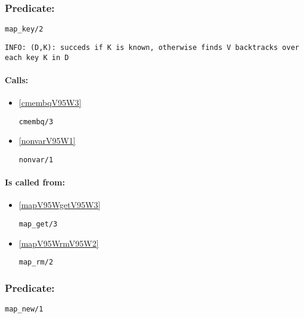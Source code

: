 \subsubsection{Predicate:} \label{mapV95WkeyV95W2}

\begin{verbatim}
map_key/2
\end{verbatim}

{\small \begin{verbatim}
INFO: (D,K): succeds if K is known, otherwise finds V backtracks over each key K in D

\end{verbatim}}
\paragraph{Calls:} 
\begin{itemize}
\item \ref{cmembqV95W3} 
\begin{verbatim}
cmembq/3
\end{verbatim}

\item \ref{nonvarV95W1} 
\begin{verbatim}
nonvar/1
\end{verbatim}

\end{itemize}
\paragraph{Is called from:} 
\begin{itemize}
\item \ref{mapV95WgetV95W3} 
\begin{verbatim}
map_get/3
\end{verbatim}

\item \ref{mapV95WrmV95W2} 
\begin{verbatim}
map_rm/2
\end{verbatim}

\end{itemize}

\subsubsection{Predicate:} \label{mapV95WnewV95W1}

\begin{verbatim}
map_new/1
\end{verbatim}

